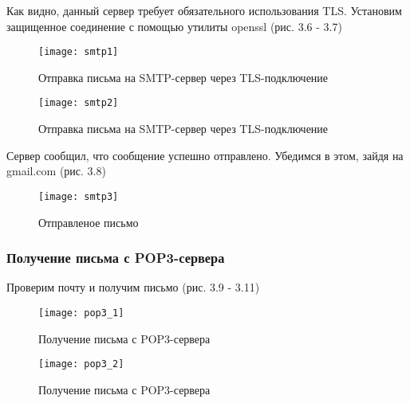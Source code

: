 Как видно, данный сервер требует обязательного использования TLS. Установим защищенное соединение с помощью утилиты openssl (рис. 3.6 - 3.7)

\begin{figure}[H]
	\begin{center}
		\texttt{[image: smtp1]}
		\caption{Отправка письма на SMTP-сервер через TLS-подключение}
		\label{pic:pic_name} %
	\end{center}
\end{figure}

\begin{figure}[H]
	\begin{center}
		\texttt{[image: smtp2]}
		\caption{Отправка письма на SMTP-сервер через TLS-подключение} 
		\label{pic:pic_name} %
	\end{center}
\end{figure}

Сервер сообщил, что сообщение успешно отправлено. Убедимся в этом, зайдя на gmail.com (рис. 3.8)

\begin{figure}[H]
	\begin{center}
		\texttt{[image: smtp3]}
		\caption{Отправленое письмо} 
		\label{pic:pic_name} %
	\end{center}
\end{figure}

\subsubsection{Получение письма с POP3-сервера}

Проверим почту и получим письмо (рис. 3.9 - 3.11)

\begin{figure}[H]
	\begin{center}
		\texttt{[image: pop3\_1]}
		\caption{Получение письма с POP3-сервера} 
		\label{pic:pic_name} %
	\end{center}
\end{figure}

\begin{figure}[H]
	\begin{center}
		\texttt{[image: pop3\_2]}
		\caption{Получение письма с POP3-сервера} 
		\label{pic:pic_name} %
	\end{center}
\end{figure}

